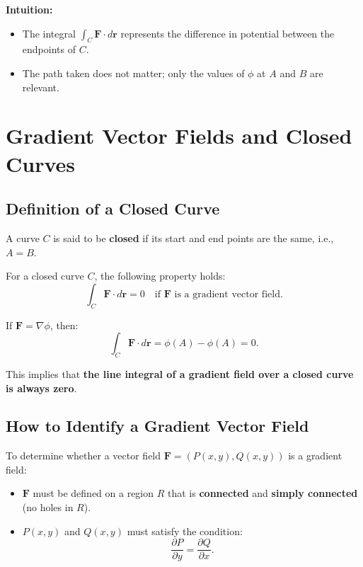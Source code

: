 \documentclass{report}
\begin{document}
\textbf{Intuition:}
\begin{itemize}
	\item The integral \( \int_C \mathbf{F} \cdot d\mathbf{r} \) represents the difference in potential between the endpoints of \( C \).
	\item The path taken does not matter; only the values of \( \phi \) at \( A \) and \( B \) are relevant.
\end{itemize}


\section{Gradient Vector Fields and Closed Curves}

\subsection{Definition of a Closed Curve}
A curve \( C \) is said to be \textbf{closed} if its start and end points are the same, i.e., \( A = B \).

For a closed curve \( C \), the following property holds:
\[
\int_C \mathbf{F} \cdot d\mathbf{r} = 0 \quad \text{if } \mathbf{F} \text{ is a gradient vector field}.
\]

If \( \mathbf{F} = \nabla \phi \), then:
\[
\int_C \mathbf{F} \cdot d\mathbf{r} = \phi(A) - \phi(A) = 0.
\]

This implies that \textbf{the line integral of a gradient field over a closed curve is always zero}.

\subsection{How to Identify a Gradient Vector Field}
To determine whether a vector field \( \mathbf{F} = (P(x, y), Q(x, y)) \) is a gradient field:
\begin{itemize}
    \item \( \mathbf{F} \) must be defined on a region \( R \) that is \textbf{connected} and \textbf{simply connected} (no holes in \( R \)).
    \item \( P(x, y) \) and \( Q(x, y) \) must satisfy the condition:
    \[
    \frac{\partial P}{\partial y} = \frac{\partial Q}{\partial x}.
    \]
\end{itemize}
\end{document}
